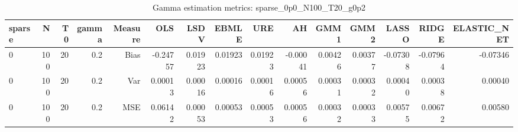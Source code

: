 \begin{table}[!htbp]\centering
\caption{Gamma estimation metrics: sparse_0p0_N100_T20_g0p2}
\label{tab:table1_sparse_0p0_N100_T20_g0p2}
\begin{tabular}{lrrrrrrrrrrrrrr}
\hline
sparse & N & T0 & gamma & Measure & OLS & LSDV & EBMLE & URE & AH & GMM1 & GMM2 & LASSO & RIDGE & ELASTIC_NET \\
\hline
0 & 100 & 20 & 0.2 & Bias & -0.24757 & 0.01923 & 0.01923 & 0.01923 & -0.00041 & 0.00426 & 0.00377 & -0.07308 & -0.07964 & -0.07346 \\
0 & 100 & 20 & 0.2 & Var & 0.00013 & 0.00016 & 0.00016 & 0.00016 & 0.00056 & 0.00031 & 0.00032 & 0.00040 & 0.00038 & 0.00040 \\
0 & 100 & 20 & 0.2 & MSE & 0.06142 & 0.00053 & 0.00053 & 0.00053 & 0.00056 & 0.00032 & 0.00033 & 0.00575 & 0.00672 & 0.00580 \\
\hline
\end{tabular}
\end{table}


